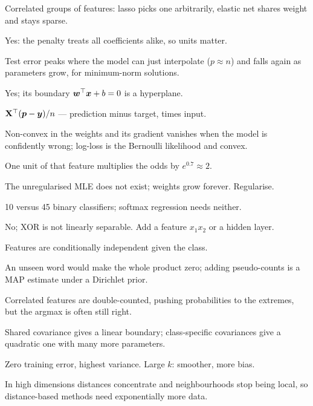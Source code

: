 {	 Correlated groups of features: lasso picks one arbitrarily, elastic net shares weight and
	stays sparse.

	 Yes: the penalty treats all coefficients alike, so units matter.

	 Test error peaks where the model can just interpolate ($p\approx n$) and falls again as
	parameters grow, for minimum-norm solutions.

	 Yes; its boundary ${\bm{w}}^{\top}{\bm{x}}+b=0$ is a hyperplane.

	 ${\mathbf{X}}^{\top}(\bm p-{\bm{y}})/n$ --- prediction minus target, times input.

	 Non-convex in the weights and its gradient vanishes when the model is
	confidently wrong; log-loss is the Bernoulli likelihood and convex.

	 One unit of that feature multiplies the odds by
	$e^{0.7}\approx2$.

	 The unregularised MLE does not exist; weights grow forever.
	Regularise.

	 10 versus 45 binary classifiers; softmax regression needs neither.

	 No; XOR is not linearly separable. Add a feature $x_1x_2$ or a hidden layer.

	 Features are conditionally independent given the class.

	 An unseen word would make the whole product zero; adding pseudo-counts is a MAP
	estimate under a Dirichlet prior.

	 Correlated features are double-counted, pushing
	probabilities to the extremes, but the argmax is often still right.

	 Shared covariance gives a linear boundary; class-specific covariances give a quadratic one with
	many more parameters.

	 Zero training error, highest variance. Large $k$: smoother, more bias.

	 In high dimensions distances concentrate and neighbourhoods stop being
	local, so distance-based methods need exponentially more data.

}

